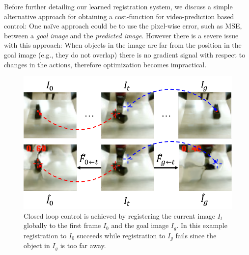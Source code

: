 Before further detailing our learned registration system, we discuss a simple alternative approach for obtaining a cost-function for video-prediction based control: One na\"{i}ve approach could be to use the pixel-wise error, such as MSE, between a \emph{goal image} and the \emph{predicted image}. However there is a severe issue with this approach: When objects in the image are far from the position in the goal image (e.g., they do not overlap) there is no gradient signal with respect to changes in the actions, therefore optimization becomes impractical. 

\begin{figure}
	\centering
	\includegraphics[width=0.8\linewidth]{images_rfr/registration_singletime.pdf}
	\vspace{-0.3cm}
	\caption{\small{Closed loop control is achieved by registering the current image $I_t$ globally to the first frame $I_0$ and the goal image $I_g$. In this example registration to $I_0$ succeeds while registration to $I_g$ fails since the object in $I_g$ is too far away.}
		\label{fig:reg_single}
	}
\end{figure}

